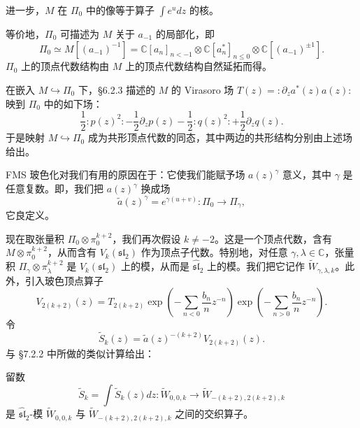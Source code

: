 进一步，$M$ 在 $\Pi_0$ 中的像等于算子 $\int e^udz$ 的核。

等价地，$\Pi_0$ 可描述为 $M$ 关于 $a_{-1}$ 的局部化，即
\begin{equation}
    \Pi_0\simeq M[(a_{-1})^{-1}]=\mathbb{C}[a_n]_{n<-1}\otimes\mathbb{C}[a_n^*]_{n\le0}\otimes\mathbb{C}[(a_{-1})^{\pm1}].
    \tag{7.2-10}
\end{equation}
$\Pi_0$ 上的顶点代数结构由 $M$ 上的顶点代数结构自然延拓而得。

在嵌入 $M\hookrightarrow\Pi_0$ 下，§6.2.3 描述的 $M$ 的 Virasoro 场 $T(z)=:\partial_za^*(z)a(z):$ 映到 $\Pi_0$ 中的如下场：
\[
    \frac{1}{2}:p(z)^2:-\frac{1}{2}\partial_zp(z)-\frac{1}{2}:q(z)^2:+\frac{1}{2}\partial_zq(z).
\]
于是映射 $M\hookrightarrow\Pi_0$ 成为共形顶点代数的同态，其中两边的共形结构分别由上述场给出。

FMS 玻色化对我们有用的原因在于：它使我们能赋予场 $a(z)^\gamma$ 意义，其中 $\gamma$ 是任意复数。即，我们把 $a(z)^\gamma$ 换成场
\[
    \widetilde{a}(z)^\gamma=e^{\gamma(u+v)}:\Pi_0\longrightarrow\Pi_\gamma,
\]
它良定义。

现在取张量积 $\Pi_0\otimes\pi_0^{k+2}$，我们再次假设 $k\ne-2$。这是一个顶点代数，含有 $M\otimes\pi_0^{k+2}$，从而含有 $V_k(\mathfrak{sl}_2)$ 作为顶点子代数。特别地，对任意 $\gamma,\lambda\in\mathbb{C}$，张量积 $\Pi_\gamma\otimes\pi_\lambda^{k+2}$ 是 $V_k(\mathfrak{sl}_2)$ 上的模，从而是 $\widehat{\mathfrak{sl}}_2$ 上的模。我们把它记作 $\widetilde{W}_{\gamma,\lambda,k}$。此外，引入玻色顶点算子
\begin{equation}
    V_{2(k+2)}(z)=T_{2(k+2)}
    \exp\left(-\sum_{n<0}\frac{b_n}{n}z^{-n}\right)
    \exp\left(-\sum_{n>0}\frac{b_n}{n}z^{-n}\right).
    \tag{7.2-11}
\end{equation}
令
\begin{equation}
    \widetilde{S}_k(z)=\widetilde{a}(z)^{-(k+2)}V_{2(k+2)}(z).
    \tag{7.2-12}
\end{equation}
与 §7.2.2 中所做的类似计算给出：

\begin{proposition}
    留数
    \[
        \widetilde{S}_k=\int\widetilde{S}_k(z)dz:\widetilde{W}_{0,0,k}\longrightarrow\widetilde{W}_{-(k+2),2(k+2),k}
    \]
    是 $\widehat{\mathfrak{sl}}_2$-模 $\widetilde{W}_{0,0,k}$ 与 $\widetilde{W}_{-(k+2),2(k+2),k}$ 之间的交织算子。
\end{proposition}

